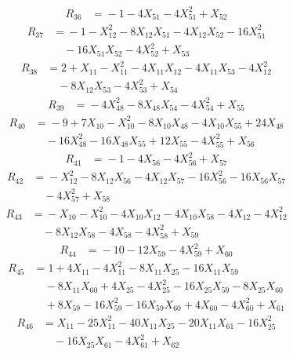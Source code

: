 \[\begin{aligned}
R_{36} &={}-1 - 4X_{51} - 4X_{51}^{2} + X_{52}
\end{aligned}\]
\[\begin{aligned}
R_{37} &={}-1 - X_{12}^{2} - 8X_{12}X_{51} - 4X_{12}X_{52} - 16X_{51}^{2}\\
&\quad{} - 16X_{51}X_{52} - 4X_{52}^{2} + X_{53}
\end{aligned}\]
\[\begin{aligned}
R_{38} &={}2 + X_{11} - X_{11}^{2} - 4X_{11}X_{12} - 4X_{11}X_{53} - 4X_{12}^{2}\\
&\quad{} - 8X_{12}X_{53} - 4X_{53}^{2} + X_{54}
\end{aligned}\]
\[\begin{aligned}
R_{39} &={}-4X_{48}^{2} - 8X_{48}X_{54} - 4X_{54}^{2} + X_{55}
\end{aligned}\]
\[\begin{aligned}
R_{40} &={}-9 + 7X_{10} - X_{10}^{2} - 8X_{10}X_{48} - 4X_{10}X_{55} + 24X_{48}\\
&\quad{} - 16X_{48}^{2} - 16X_{48}X_{55} + 12X_{55} - 4X_{55}^{2} + X_{56}
\end{aligned}\]
\[\begin{aligned}
R_{41} &={}-1 - 4X_{56} - 4X_{56}^{2} + X_{57}
\end{aligned}\]
\[\begin{aligned}
R_{42} &={}-X_{12}^{2} - 8X_{12}X_{56} - 4X_{12}X_{57} - 16X_{56}^{2} - 16X_{56}X_{57}\\
&\quad{} - 4X_{57}^{2} + X_{58}
\end{aligned}\]
\[\begin{aligned}
R_{43} &={}-X_{10} - X_{10}^{2} - 4X_{10}X_{12} - 4X_{10}X_{58} - 4X_{12} - 4X_{12}^{2}\\
&\quad{} - 8X_{12}X_{58} - 4X_{58} - 4X_{58}^{2} + X_{59}
\end{aligned}\]
\[\begin{aligned}
R_{44} &={}-10 - 12X_{59} - 4X_{59}^{2} + X_{60}
\end{aligned}\]
\[\begin{aligned}
R_{45} &={}1 + 4X_{11} - 4X_{11}^{2} - 8X_{11}X_{25} - 16X_{11}X_{59}\\
&\quad{} - 8X_{11}X_{60} + 4X_{25} - 4X_{25}^{2} - 16X_{25}X_{59} - 8X_{25}X_{60}\\
&\quad{} + 8X_{59} - 16X_{59}^{2} - 16X_{59}X_{60} + 4X_{60} - 4X_{60}^{2} + X_{61}
\end{aligned}\]
\[\begin{aligned}
R_{46} &={}X_{11} - 25X_{11}^{2} - 40X_{11}X_{25} - 20X_{11}X_{61} - 16X_{25}^{2}\\
&\quad{} - 16X_{25}X_{61} - 4X_{61}^{2} + X_{62}
\end{aligned}\]

